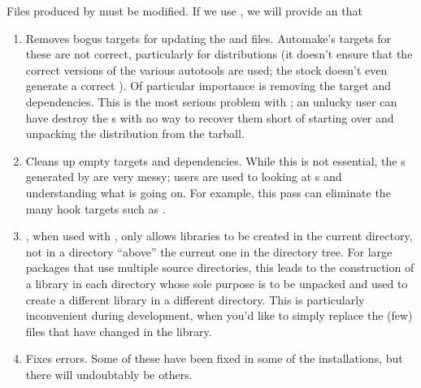 \documentclass{article}
\begin{document}
Files produced by  must be modified.  If we use
, we will provide an  that 
\begin{enumerate}
\item Removes bogus targets for updating the  and
   files.  Automake's targets for these are not correct,
  particularly for distributions (it doesn't ensure that the correct versions
  of the various autotools are used; the stock  doesn't even
  generate a correct ).  Of particular importance is
  removing the  target and dependencies.  This is the most 
  serious problem with ; an unlucky user can have
   destroy the s with no way to recover them
  short of starting over and unpacking the distribution from the tarball.

\item Cleans up empty targets and dependencies.  While this is not essential,
  the 
  s generated by  are very messy; users are
  used to looking at s and understanding what is going on.  For
  example, this pass can eliminate the many hook targets such as
  .

\item {}, when used with , only allows libraries to
  be created in the current directory, not in a directory ``above'' the
  current one in the directory tree.  For large packages that use multiple
  source directories, this leads to the construction of a library in each
  directory whose sole purpose is to be unpacked and used to create a
  different library in a different directory.  This is particularly
  inconvenient during development, when you'd like to simply replace the (few)
  files that have changed in the library.

\item Fixes errors.  Some of these have been fixed in some of the
   installations, but there will undoubtably be others.
\end{enumerate}

\fi

\let\SaveBibliography=\thebibliography
\def\thebibliography#1{\SaveBibliography{#1}\addcontentsline{toc}{section}{References}}



\let\SaveIndex=\theindex
\def\theindex{\SaveIndex\addcontentsline{toc}{section}{Index}}

\end{document}
